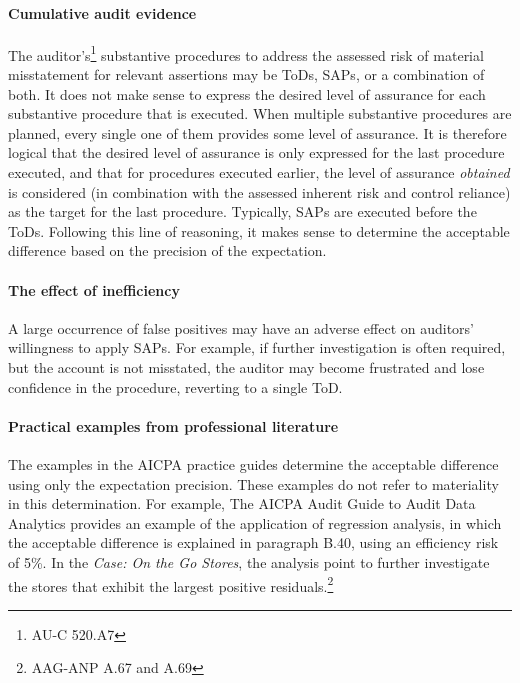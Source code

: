 \documentclass[12pt,a4paper]{memoir}
\begin{document}
\paragraph{Cumulative audit evidence}The auditor's\footnote{AU-C 520.A7} substantive procedures to address the assessed risk of material misstatement for relevant assertions may be ToDs, SAPs, or a combination of both. It does not make sense to express the desired level of assurance for each substantive procedure that is executed. When multiple substantive procedures are planned, every single one of them provides some level of assurance. It is therefore logical that the desired level of assurance is only expressed for the last procedure executed, and that for procedures executed earlier, the level of assurance \emph{obtained} is considered (in combination with the assessed inherent risk and control reliance) as the target for the last procedure. Typically, SAPs are executed before the ToDs. Following this line of reasoning, it makes sense to determine the acceptable difference based on the precision of the expectation.

\paragraph{The effect of inefficiency} A large occurrence of false positives may have an adverse effect on auditors' willingness to apply SAPs. For example, if further investigation is often required, but the account is not misstated, the auditor may become frustrated and lose confidence in the procedure, reverting to a single ToD.

\paragraph{Practical examples from professional literature} The examples in the AICPA practice guides determine the acceptable difference using only the expectation precision. These examples do not refer to materiality in this determination. For example, The AICPA Audit Guide to Audit Data Analytics provides an example of the application of regression analysis, in which the acceptable difference is explained in paragraph B.40, using an efficiency risk of 5\%. In the \textit{Case: On the Go Stores}, the analysis point to further investigate the stores that exhibit the largest positive residuals.\footnote{AAG-ANP A.67 and A.69} 
\end{document}
